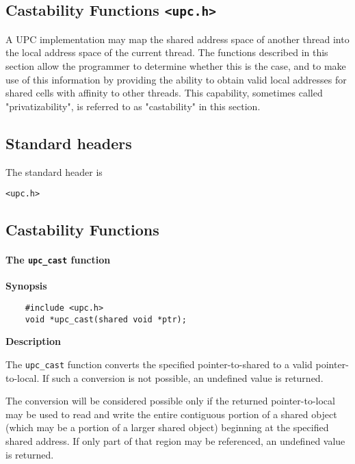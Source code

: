 \subsection{Castability Functions {\tt <upc.h>}}
\label{upc-castable}

\np A UPC implementation may map the shared address space of another thread
into the local address space of the current thread.  The functions described
in this section allow the programmer to determine whether this is the case,
and to make use of this information by providing the ability to obtain valid
local addresses for shared cells with affinity to other threads.  This
capability, sometimes called "privatizability", is referred to as "castability"
in this section.

\subsection{Standard headers}

\np The standard header is

{\tt <upc.h>}

\subsection{Castability Functions}

\paragraph{The {\tt upc\_cast} function}

{\bf Synopsis}

\npf\vspace{-2.5em}
\begin{verbatim}
    #include <upc.h>
    void *upc_cast(shared void *ptr);
\end{verbatim}

{\bf Description}

\np The {\tt upc\_cast} function converts the specified pointer-to-shared to a
valid pointer-to-local.  If such a conversion is not possible, an undefined
value is returned.

The conversion will be considered possible only if the returned pointer-to-local
may be used to read and write the entire contiguous portion of a
shared object (which may be a portion of a larger shared object)
beginning at the specified shared address.  If only part of that
region may be referenced, an undefined value is returned.

